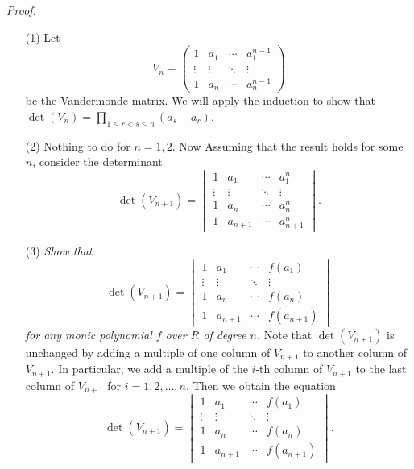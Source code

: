 \documentclass{article}
\begin{document}
\emph{Proof.}
\begin{enumerate}
\item[(1)]
  Let
  \[
    V_n =
    \begin{pmatrix}
      1 & a_1 & \cdots & a_1^{n-1} \\
      \vdots & \vdots & \ddots & \vdots \\
      1 & a_n & \cdots & a_n^{n-1}
    \end{pmatrix}
  \]
  be the Vandermonde matrix.
  We will apply the induction to show that $\det(V_n) = \prod_{1 \leq r < s \leq n}(a_s - a_r)$.

\item[(2)]
  Nothing to do for $n = 1, 2$.
  Now Assuming that the result holds for some $n$, consider the determinant
  \[
    \det(V_{n+1}) = \begin{vmatrix}
      1 & a_1 & \cdots & a_1^{n} \\
      \vdots & \vdots & \ddots & \vdots \\
      1 & a_n & \cdots & a_n^{n} \\
      1 & a_{n+1} & \cdots & a_{n+1}^{n}
    \end{vmatrix}.
  \]

\item[(3)]
  \emph{Show that
  \[
    \det(V_{n+1}) = \begin{vmatrix}
      1 & a_1 & \cdots & f(a_1) \\
      \vdots & \vdots & \ddots & \vdots \\
      1 & a_n & \cdots & f(a_n) \\
      1 & a_{n+1} & \cdots & f(a_{n+1})
    \end{vmatrix}
  \]
  for any monic polynomial $f$ over $R$ of degree $n$.}
  Note that $\det(V_{n+1})$ is unchanged by adding a multiple of one column of $V_{n+1}$
  to another column of $V_{n+1}$.
  In particular, we add a multiple of the $i$-th column of $V_{n+1}$ to
  the last column of $V_{n+1}$ for $i = 1, 2, \ldots, n$.
  Then we obtain the equation
  \[
    \det(V_{n+1}) = \begin{vmatrix}
      1 & a_1 & \cdots & f(a_1) \\
      \vdots & \vdots & \ddots & \vdots \\
      1 & a_n & \cdots & f(a_n) \\
      1 & a_{n+1} & \cdots & f(a_{n+1})
    \end{vmatrix}.
  \]


\end{enumerate}
\end{document}
